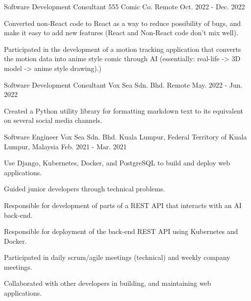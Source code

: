 

\begin{cventries}

\cventry
  {Software Development Consultant} %
  {555 Comic Co.} %
  {Remote} %
  {Oct. 2022 - Dec. 2022} %
  {
    \begin{cvitems} %
      \item {Converted non-React code to React as a way to reduce possibility of bugs, and make it easy to add new features (React and Non-React code don't mix well).}
      \item {Participated in the development of a motion tracking application that converts the motion data into anime style comic through AI (essentially: real-life -> 3D model -> anime style drawing).)}
    \end{cvitems}
  }


  \cventry
    {Software Development Consultant} %
    {Vox Sea Sdn. Bhd.} %
    {Remote} %
    {May. 2022 - Jun. 2022} %
    {
      \begin{cvitems} %
        \item {Created a Python utility library for formatting markdown text to its equivalent on several social media channels.}
      \end{cvitems}
    }

  \cventry
    {Software Engineer} %
    {Vox Sea Sdn. Bhd.} %
    {Kuala Lumpur, Federal Territory of Kuala Lumpur, Malaysia} %
    {Feb. 2021 - Mar. 2021} %
    {
      \begin{cvitems} %
        \item {Use Django, Kubernetes, Docker, and PostgreSQL to build and deploy web applications.}
        \item {Guided junior developers through technical problems.}
        \item {Responsible for development of parts of a REST API that interacts with an AI back-end.}
        \item {Responsible for deployment of the back-end REST API using Kubernetes and Docker.}
        \item {Participated in daily scrum/agile meetings (technical) and weekly company meetings.}
        \item {Collaborated with other developers in building, and maintaining web applications.}
      \end{cvitems}
    }


\end{cventries}
